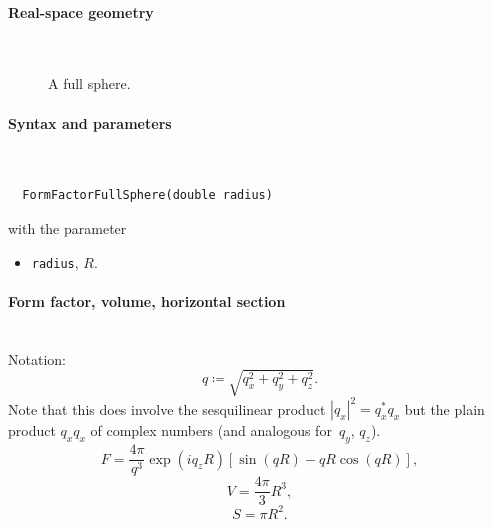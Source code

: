  \label{SFullSphere}

\paragraph{Real-space geometry}\strut\\

\begin{figure}[H]
\hfill
{}
\hfill
{}
\hfill
{}
\hfill
\caption{A full sphere.}
\end{figure}

\FloatBarrier

\paragraph{Syntax and parameters}\strut\\[-2ex plus .2ex minus .2ex]
\begin{lstlisting}
  FormFactorFullSphere(double radius)
\end{lstlisting}
with the parameter
\begin{itemize}
\item \texttt{radius}, $R$.
\end{itemize}

\paragraph{Form factor, volume, horizontal section}\strut\\
Notation:
\begin{equation*}
  q \coloneqq \sqrt{q_x^2+q_y^2+q_z^2}.
\end{equation*}
Note that this does  involve the sesquilinear product
$|q_x|^2=q_x^* q_x$ but the plain product $q_xq_x$ of complex numbers
(and analogous for~$q_y$, $q_z$).
\begin{equation*}
F = \frac{4\pi}{q^3} \exp(iq_z R)\left[\sin(qR) - qR \cos(qR)\right],
\end{equation*}
\begin{equation*}
  V = \dfrac{4\pi}{3}R^3,
\end{equation*}
\begin{equation*}
  S= \pi R^2.
\end{equation*}

